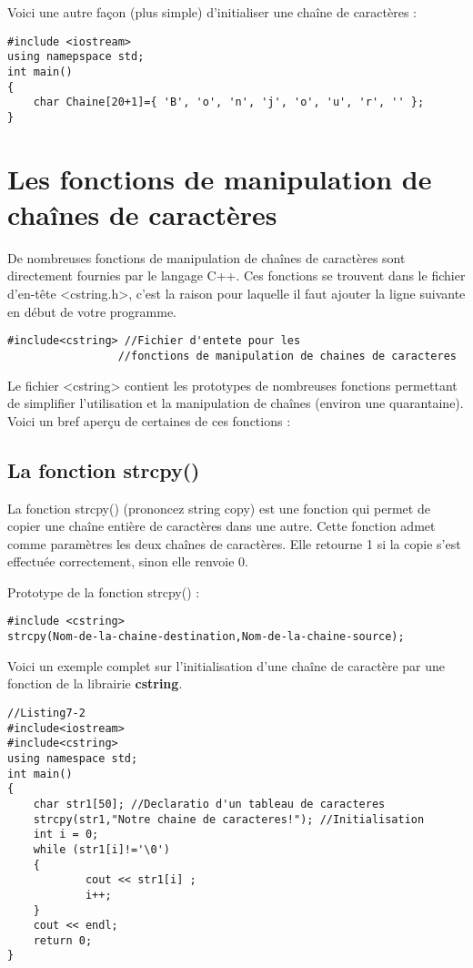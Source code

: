 \documentclass[a4paper, oneside,11pt]{book}
\begin{document}
Voici une autre façon (plus simple) d'initialiser une cha\^ine de caract\`eres :


\begin{lstlisting}
#include <iostream>
using namepspace std;
int main()
{
    char Chaine[20+1]={ 'B', 'o', 'n', 'j', 'o', 'u', 'r', '' };
}
\end{lstlisting}


\section{Les fonctions de manipulation de cha\^ines de caract\`eres}

De nombreuses fonctions de manipulation de cha\^ines de caract\`eres sont 
directement fournies par le langage C++. Ces fonctions se trouvent dans le fichier 
d'en-t\^ete <cstring.h>, c'est la raison pour laquelle il faut ajouter
la ligne suivante en d\'ebut de votre programme.


\begin{lstlisting}
#include<cstring> //Fichier d'entete pour les
                 //fonctions de manipulation de chaines de caracteres
\end{lstlisting}


Le fichier <cstring> contient les prototypes de nombreuses fonctions permettant 
de simplifier l'utilisation et la manipulation de cha\^ines (environ une quarantaine).
Voici un bref aperçu de certaines de ces fonctions :

\subsection{La fonction strcpy()}

La fonction strcpy() (prononcez string copy) est une fonction qui permet de copier
une cha\^ine enti\`ere de caract\`eres dans une autre.
Cette fonction admet comme param\`etres les deux cha\^ines
de caract\`eres. Elle retourne 1 si la copie s'est effectu\'ee correctement,
sinon elle renvoie 0.


Prototype de la fonction strcpy() :

\begin{lstlisting}
#include <cstring>
strcpy(Nom-de-la-chaine-destination,Nom-de-la-chaine-source);
\end{lstlisting}
Voici un exemple complet  sur l'initialisation d'une cha\^ine de caract\`ere par une fonction de la librairie \textbf{cstring}.

\begin{lstlisting}
//Listing7-2
#include<iostream>
#include<cstring>
using namespace std;
int main()
{
    char str1[50]; //Declaratio d'un tableau de caracteres
    strcpy(str1,"Notre chaine de caracteres!"); //Initialisation
    int i = 0;
    while (str1[i]!='\0')
    {
            cout << str1[i] ;
            i++;
    }
    cout << endl;
    return 0;
}
\end{lstlisting}
\end{document}

